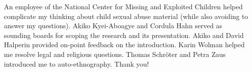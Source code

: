 \documentclass[authorversion,nonacm,screen]{acmart}
\begin{document}
\begin{abstract}

\end{abstract}


\maketitle









\begin{acks}
An employee of the National Center for Missing and Exploited Children helped
complicate my thinking about child sexual abuse material (while also avoiding to
answer my questions). Akiko Kyei-Aboagye and Cordula Hahn served as sounding
boards for scoping the research and its presentation. Akiko and David Halperin
provided on-point feedback on the introduction. Karin Wolman helped me resolve
legal and religious questions. Thomas Schr\"{o}ter and Petra Zaus introduced me
to auto-ethnography. Thank you!
\end{acks}





\appendix






\end{document}

